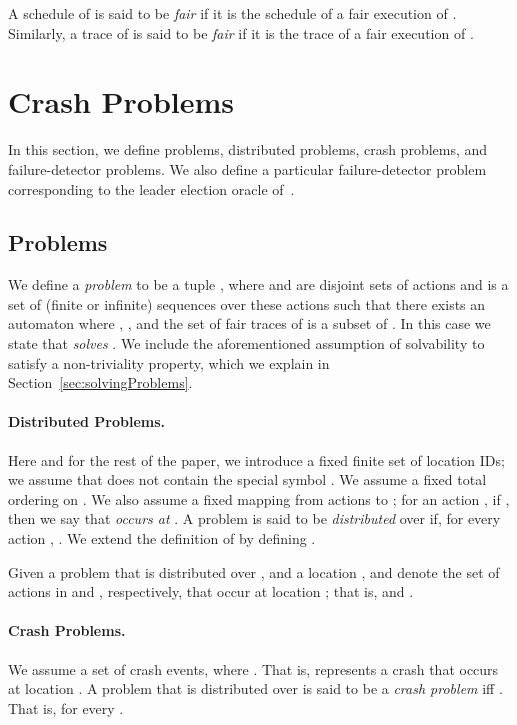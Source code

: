 \documentclass[11pt]{article}
\numberwithin{theorem}{section}
\begin{document}
A schedule  of  is said to be \emph{fair} if it is the
schedule of a fair execution of . 
Similarly, a trace  of  is said to be \emph{fair} if it is the
trace of a fair execution of .



\section{Crash Problems}

In this section, we define problems, distributed problems,
crash problems, and failure-detector problems.
We also define a particular failure-detector problem corresponding to
the leader election oracle  of~\cite{chan:twfdf}.

\subsection{Problems} 
\label{subsec:problems}

We define a \emph{problem}  to be a tuple , where
 and  are disjoint sets of actions and  is a set of
(finite or infinite) sequences over these actions such that there
exists an automaton  where , , and
the set of fair traces of  is a subset of .  
In this case we state that  \emph{solves} .
We include the aforementioned assumption of solvability to satisfy a non-triviality
property, which we explain in Section~\ref{sec:solvingProblems}.

\paragraph{Distributed Problems.}
Here and for the rest of the paper, we introduce a fixed finite set
 of  location IDs; we assume that  does not contain the
special symbol . We assume a fixed total ordering  on .
We also assume a fixed mapping  from actions to ; for an action , if , then we say that 
\emph{occurs at} . 
A problem  is said to be \emph{distributed} over  if, for every
action , . 
We extend the definition of  by defining .


Given a problem  that is distributed over , and a location ,  and  denote the set of actions in 
and , respectively, that occur at location ;
that is,  and . 



\paragraph{Crash Problems.}
We assume a set  of crash
events, where . 
That is,  represents a crash that occurs at location .
A problem  that is distributed over  is said
to be a \emph{crash problem} iff . 
That is,  for every .
\end{document}
